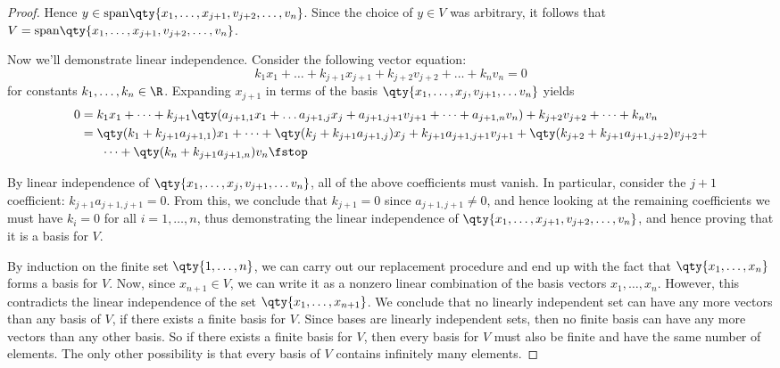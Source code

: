\begin{proof}
  Hence \( y\in\text{span}\qty{x_1,\dots,x_{j+1},v_{j+2},\dots,v_n} \). Since the choice of \( y\in V \) was arbitrary, it follows that \( V=\text{span}\qty{x_1,\dots,x_{j+1},v_{j+2},\dots,v_n} \).

  \vspace{3mm}

  Now we'll demonstrate linear independence. Consider the following vector equation:
  \[ k_1x_1+\dots+k_{j+1}x_{j+1}+k_{j+2}v_{j+2}+\dots+k_nv_n=0 \]
  for constants \( k_1,\dots,k_n\in\R \). Expanding \( x_{j+1} \) in terms of the basis \( \qty{x_1,\dots, x_j, v_{j+1},\dots v_n} \) yields
  \begin{align*}
    0&= k_1x_1+\dots+k_{j+1}\qty(a_{j+1,1}x_1+\dots a_{j+1,j}x_j+a_{j+1,j+1}v_{j+1}+\dots+a_{j+1,n}v_n)+k_{j+2}v_{j+2}+\dots+k_nv_n\\
    &= \qty(k_1+k_{j+1}a_{j+1,1})x_1+\dots+\qty(k_j+k_{j+1}a_{j+1,j})x_j+k_{j+1}a_{j+1,j+1}v_{j+1}+\qty(k_{j+2}+k_{j+1}a_{j+1,j+2})v_{j+2}+\\
    &\hspace{6mm}\dots+\qty(k_n+k_{j+1}a_{j+1,n})v_n\fstop
  \end{align*}

  By linear independence of \( \qty{x_1,\dots, x_j, v_{j+1},\dots v_n} \), all of the above coefficients must vanish. In particular, consider the \( j+1 \) coefficient: \( k_{j+1}a_{j+1,j+1}=0 \). From this, we conclude that \( k_{j+1}=0 \) since \( a_{j+1,j+1}\neq 0 \), and hence looking at the remaining coefficients we must have \( k_i=0 \) for all \( i=1,\dots, n \), thus demonstrating the linear independence of \( \qty{x_1,\dots,x_{j+1},v_{j+2},\dots,v_n} \), and hence proving that it is a basis for \( V \).

  \vspace{3mm}

  By induction on the finite set \( \qty{1,\dots,n} \), we can carry out our replacement procedure and end up with the fact that \( \qty{x_1,\dots,x_n} \) forms a basis for \( V \). Now, since \( x_{n+1}\in V \), we can write it as a nonzero linear combination of the basis vectors \( x_1,\dots,x_n \). However, this contradicts the linear independence of the set \( \qty{x_1,\dots,x_{n+1}} \). We conclude that no linearly independent set can have any more vectors than any basis of \( V \), if there exists a finite basis for \( V \). Since bases are linearly independent sets, then no finite basis can have any more vectors than any other basis. So if there exists a finite basis for \( V \), then every basis for \( V \) must also be finite and have the same number of elements. The only other possibility is that every basis of \( V \) contains infinitely many elements.
\end{proof}

